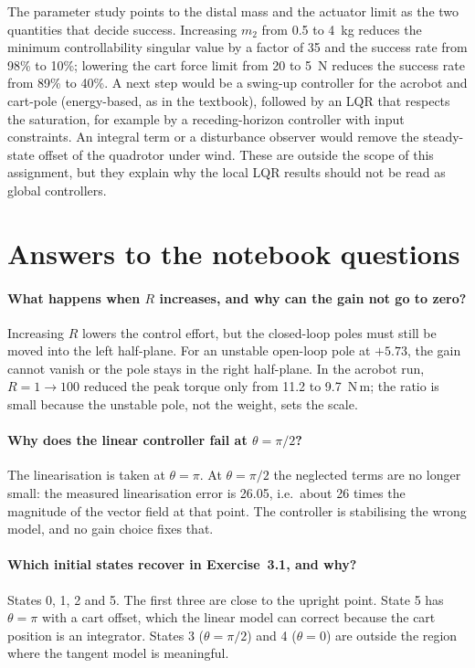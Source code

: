 \documentclass[11pt]{report}
\begin{document}
The parameter study points to the distal mass and the actuator limit as the two
quantities that decide success.  Increasing $m_2$ from 0.5 to 4~kg reduces the
minimum controllability singular value by a factor of 35 and the success rate
from 98\% to 10\%; lowering the cart force limit from 20 to 5~N reduces the
success rate from 89\% to 40\%.  A next step would be a swing-up controller for
the acrobot and cart-pole (energy-based, as in the textbook), followed by an
LQR that respects the saturation, for example by a receding-horizon controller
with input constraints.  An integral term or a disturbance observer would
remove the steady-state offset of the quadrotor under wind.  These are outside
the scope of this assignment, but they explain why the local LQR results should
not be read as global controllers.

\section{Answers to the notebook questions}

\paragraph{What happens when $R$ increases, and why can the gain not go to
zero?}  Increasing $R$ lowers the control effort, but the closed-loop poles
must still be moved into the left half-plane.  For an unstable open-loop pole
at $+5.73$, the gain cannot vanish or the pole stays in the right half-plane.
In the acrobot run, $R=1\to100$ reduced the peak torque only from 11.2 to
9.7~N\,m; the ratio is small because the unstable pole, not the weight,
sets the scale.

\paragraph{Why does the linear controller fail at $\theta=\pi/2$?}  The
linearisation is taken at $\theta=\pi$.  At $\theta=\pi/2$ the neglected terms
are no longer small: the measured linearisation error is 26.05, i.e.\ about 26
times the magnitude of the vector field at that point.  The controller is
stabilising the wrong model, and no gain choice fixes that.

\paragraph{Which initial states recover in Exercise~3.1, and why?}  States 0,
1, 2 and 5.  The first three are close to the upright point.  State 5 has
$\theta=\pi$ with a cart offset, which the linear model can correct because the
cart position is an integrator.  States 3 ($\theta=\pi/2$) and 4
($\theta=0$) are outside the region where the tangent model is meaningful.
\end{document}
